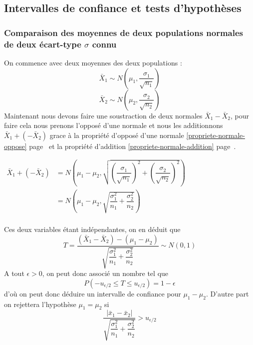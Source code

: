 \newpage
\subsection{Intervalles de confiance et tests d'hypothèses}
\subsubsection{Comparaison des moyennes de deux populations normales de deux écart-type $\sigma$ connu}
On commence avec deux moyennes des deux populations :
$$\bar{X}_1 \sim N \left( \mu_1, \dfrac{\sigma_1}{\sqrt{n_1}} \right)$$
$$\bar{X}_2 \sim N \left( \mu_2, \dfrac{\sigma_2}{\sqrt{n_2}} \right)$$
Maintenant nous devons faire une soustraction de deux normales $\bar{X}_1 - \bar{X}_2$, pour faire cela nous prenons l'opposé d'une normale et nous les additionnons $\bar{X}_1 + (-\bar{X}_2)$ grace à la propriété d'opposé d'une normale \ref{propriete-normale-oppose} page~\pageref{propriete-normale-oppose} et la propriété d'addition \ref{propriete-normale-addition} page~\pageref{propriete-normale-addition}.
\begin{center}
$\begin{array}{LL}
\bar{X}_1 + (-\bar{X}_2) &= N \left( \mu_1 - \mu_2, \sqrt{\left(\dfrac{\sigma_1}{\sqrt{n_1}}\right)^2 + \left(\dfrac{\sigma_2}{\sqrt{n_2}}\right)^2} \right)\\
                      &= N \left( \mu_1 - \mu_2, \sqrt{\dfrac{\sigma_1^2}{n_1} + \dfrac{\sigma_2^2}{n_2}} \right)\\
\end{array}$
\end{center}
Ces deux variables étant indépendantes, on en déduit que
$$\boxed{T = \dfrac{(\bar{X}_1 - \bar{X}_2) - (\mu_1 - \mu_2)}{\sqrt{\dfrac{\sigma_1^2}{n_1} + \dfrac{\sigma_2^2}{n_2}}} \sim N(0,1)}$$
A tout $\epsilon > 0$, on peut donc associé un nombre tel que $$P\left(-u_{\epsilon/2} \leq T \leq u_{\epsilon/2} \right) = 1 - \epsilon$$ d'où on peut donc déduire un intervalle de confiance pour $\mu_1 - \mu_2$. D'autre part on rejettera l'hypothèse $\mu_1 = \mu_2$ si $$\dfrac{|\bar{x}_1 - \bar{x}_2|}{\sqrt{\dfrac{\sigma_1^2}{n_1} + \dfrac{\sigma_2^2}{n_2}}} > u_{\epsilon/2}$$







\newpage
